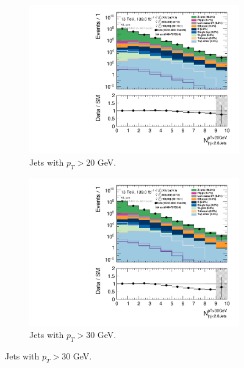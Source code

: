 \begin{figure}[H]\ContinuedFloat
\centering
    \begin{subfigure}[t!]{0.49\textwidth}
        \includegraphics[width=\textwidth]{Figures/SlepSlep/CutAndCount/ML_cuts/hist1d_nJet20_ML_cuts.pdf}
    \caption{Jets with $p_T > 20$ GeV.}
    \label{fig:my_label}
    \end{subfigure}
    \begin{subfigure}[t!]{0.49\textwidth}
        \includegraphics[width=\textwidth]{Figures/SlepSlep/CutAndCount/ML_cuts/hist1d_nJet30_ML_cuts.pdf}
   \caption{Jets with $p_T > 30$ GeV.}
   \label{fig:my_label}

\end{subfigure}
\end{figure}
